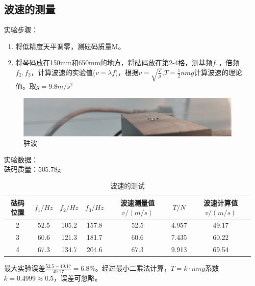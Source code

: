 \documentclass[11pt]{article}
\begin{document}
\subsection{波速的测量}
\noindent 实验步骤：
\begin{enumerate}
    \item 将低精度天平调零，测砝码质量M。
    \item 将琴码放在150mm和650mm的地方，将砝码放在第2-4格，测基频$f_1$，倍频$f_2,f_3$，计算波速的实验值($v=\lambda f$)，根据$v=\sqrt{\frac{T}{\mu}}$,$T=\frac{1}{2}nmg$计算波速的理论值。取$g=9.8m/s^2$
\end{enumerate}
\begin{figure}[H]
    \centering
    \includegraphics[width=14cm]{Fig/2.jpg}
    \caption{驻波}
\end{figure}
\noindent 实验数据：
\\砝码质量：505.78g
\begin{table}[H]
    \centering
    \caption{波速的测试}
    \begin{tabular}{|c|c|c|c|c|c|c|}
    \hline
        砝码位置 & $f_1/Hz$ & $f_2/Hz$ & $f_3/Hz$ & 波速测量值$v/(m/s)$ & $T/N$ & 波速计算值$v/(m/s)$ \\ \hline
        2 & 52.5 & 105.2 & 157.8 & 52.5 & 4.957  & 49.17  \\ \hline
        3 & 60.6 & 121.3 & 181.7 & 60.6 & 7.435  & 60.22  \\ \hline
        4 & 67.3 & 134.7 & 204.6 & 67.3 & 9.913  & 69.54 \\ \hline
    \end{tabular}
\end{table}
最大实验误差$\frac{52.5-49.17}{49.17}=6.8\%$。经过最小二乘法计算，$T=k\cdot nmg$系数$k=0.4999\approx0.5$，误差可忽略。
\end{document}
